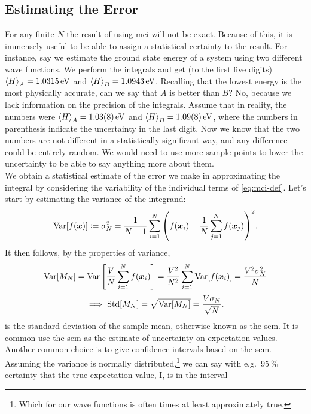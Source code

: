 \documentclass[Thesis.tex]{subfiles}
\begin{document}
\subsection{Estimating the Error}

For any finite $N$ the result of using \gls{mci} will not be exact. Because of
this, it is immensely useful to be able to assign a statistical certainty to the
result. For instance, say we estimate the ground state energy of a system using
two different wave functions. We perform the integrals and get (to the first
five digits) $\expval{H}_A = \SI{1.0315}{eV}$ and $\expval{H}_B =
\SI{1.0943}{eV}$. Recalling that the lowest energy is the most physically
accurate, can we say that $A$ is better than $B$? No, because we lack
information on the precision of the integrals. Assume that in reality, the
numbers were $\expval{H}_A=\SI{1.03(8)}{eV}$ and
$\expval{H}_B=\SI{1.09(8)}{eV}$, where the numbers in parenthesis indicate the
uncertainty in the last digit. Now we know that the two numbers are not
different in a statistically significant way, and any difference could be
entirely random. We would need to use more sample points to lower the
uncertainty to be able to say anything more about them.\\

We obtain a statistical estimate of the error we make in approximating the
integral by considering the variability of the individual terms of
\cref{eq:mci-def}. Let's start by estimating the variance of the integrand:
\begin{align}
    \operatorname{Var}[f(\bm{x})] \vcentcolon= \sigma^2_N = \frac{1}{N-1} \sum_{i=1}^N\qty(f(\bm{x}_i) - \frac{1}{N}\sum_{j=1}^N f(\bm{x}_j))^2.
\end{align}
It then follows, by the properties of variance,
\begin{align}
  \label{eq:mci-annon-2}
    \operatorname{Var}[M_N] = \operatorname{Var}\qty[ \frac{V}{N} \sum_{i=1}^Nf(\bm{x}_i)] = \frac{V^2}{N^2}\sum_{i=1}^N\operatorname{Var}[f(\bm{x}_i)] = \frac{V^2\sigma^2_N}{N}
\end{align}
\begin{align}
  \label{eq:mci-sem-def}
    \implies \operatorname{Std}[M_N] = \sqrt{\operatorname{Var}[M_N]} = \frac{V\sigma_N}{\sqrt N}.
\end{align}
 is the standard deviation of the sample mean, otherwise
known as the \gls{sem}. It is common use the \gls{sem} as the estimate of uncertainty on
expectation values. Another common choice is to give confidence intervals
based on the \gls{sem}. Assuming the variance is normally
distributed,\footnote{Which for our wave functions is often times at least
  approximately true.} we can say with e.g.\ $\SI{95}{\percent}$ certainty that
the true expectation value, I, is in the interval
\end{document}
